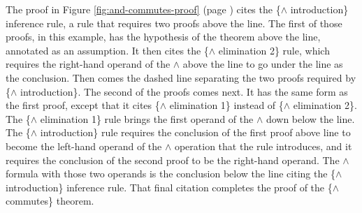 The proof in
Figure \ref{fig:and-commutes-proof} (page \pageref{fig:and-commutes-proof})
cites the \{$\wedge$ introduction\} inference rule,
a rule that requires two proofs above the line.
The first of those proofs, in this example, has the hypothesis
of the theorem above the line, annotated as an assumption.
It then cites the \{$\wedge$ elimination 2\} rule,
which requires the right-hand operand of the $\wedge$
above the line to go under the line as the conclusion.
Then comes the dashed line separating
the two proofs required by \{$\wedge$ introduction\}.
The second of the proofs comes next.
It has the same form as the first proof,
except that it cites \{$\wedge$ elimination 1\} instead of \{$\wedge$ elimination 2\}.
The \{$\wedge$ elimination 1\} rule brings the first operand of the $\wedge$
down below the line.
The \{$\wedge$ introduction\} rule requires the
conclusion of the first proof above line to
become the left-hand operand of the $\wedge$
operation that the rule introduces,
and it requires the conclusion of the second
proof to be the right-hand operand.
The $\wedge$ formula with those two operands
is the conclusion below the line citing the \{$\wedge$ introduction\} inference rule.
That final citation completes the proof of the \{$\wedge$ commutes\} theorem.

